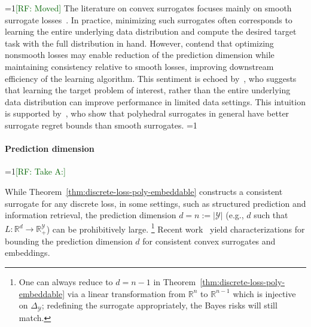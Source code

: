 \documentclass[11pt]{article}
\newcommand{\Comments}{1}
\newcommand{\mynote}[2]{\ifnum\Comments=1\textcolor{#1}{#2}\fi}
\newcommand{\mytodo}[2]{\ifnum\Comments=1%
  \todo[linecolor=#1!80!black,backgroundcolor=#1,bordercolor=#1!80!black]{#2}\fi}
\newcommand{\raf}[1]{\mynote{darkgreen}{[RF: #1]}}
\newcommand{\jessiet}[1]{\mytodo{teal!20!white}{JF: #1}}
\newcommand{\reals}{\mathbb{R}}
\newcommand{\simplex}{\Delta_\Y}
\newcommand{\Y}{\mathcal{Y}}
\begin{document}
\raf{Moved}
The literature on convex surrogates focuses mainly on smooth surrogate losses~\citep{crammer2001algorithmic,bartlett2006convexity,bartlett2008classification, duchi2018multiclass, williamson2016composite, reid2010composite,menon2019multilabel,zhang2020convex,bao2020calibrated}.
In practice, minimizing such surrogates often corresponds to learning the entire underlying data distribution and compute the desired target task with the full distribution in hand.
However, \citet[Section 1.2]{ramaswamy2018consistent} contend that optimizing nonsmooth losses may enable reduction of the prediction dimension while maintaining consistency relative to smooth losses, improving downstream efficiency of the learning algorithm.
This sentiment is echoed by~\citet{lapin2016loss}, who suggests that learning the target problem of interest, rather than the entire underlying data distribution can improve performance in limited data settings.
This intuition is supported by~\citet{frongillo2021surrogate}, who show that polyhedral surrogates in general have better surrogate regret bounds than smooth surrogates. \jessiet{This connection correct?}

\paragraph{Prediction dimension}

\raf{Take A:}

While Theorem~\ref{thm:discrete-loss-poly-embeddable} constructs a consistent surrogate for any discrete loss, in some settings, such as structured prediction and information retrieval, the prediction dimension $d = n := |\Y|$ (e.g., $d$ such that $L : \reals^d \to \reals^\Y_+$) can be prohibitively large.%
\footnote{One can always reduce to $d=n-1$ in Theorem~\ref{thm:discrete-loss-poly-embeddable} via a linear transformation from $\reals^n$ to $\reals^{n-1}$ which is injective on $\simplex$; redefining the surrogate appropriately, the Bayes risks will still match.}
Recent work~\citep{ramaswamy2016convex,finocchiaro2020embedding,finocchiaro2021unifying} yield characterizations for bounding the prediction dimension $d$ for consistent convex surrogates and embeddings.
\end{document}
